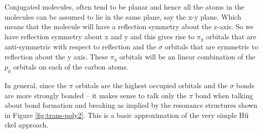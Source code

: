 \documentclass[9pt,twocolumn,twoside]{optica}
\begin{document}
Conjugated molecules, often tend to be planar and hence all the atoms in the molecules can be assumed to lie in the same plane, say the x-y plane. Which means that the molecule will have a reflection symmetry about the z-axis. So we have reflection symmetry about x and y and this gives rise to $\pi_y$ orbitals that are anti-symmetric with respect to reflection and the $\sigma$ orbitals that are symmetric to reflection about the y axis. These $\pi_y$ orbitals will be an linear combination of the $p_y$
orbitals on each of the carbon atoms. 

In general, since the $\pi$ orbitals are the highest occupied orbitals and the $\sigma$ bonds are more strongly bonded -- it makes sense to talk only the $\pi$ bond when talking about bond formation and breaking as implied by the resonance structures shown in Figure \ref{fig:trans-poly2}.  This is a basic approximation of the very simple H$\ddot{\text u}$ckel approach.
\end{document}

